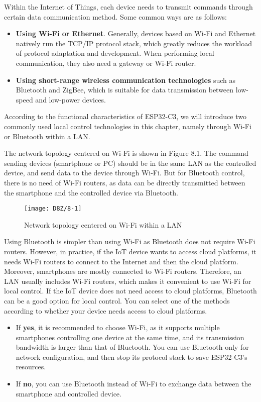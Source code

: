 \documentclass[a4paper,12pt]{book}
\begin{document}
Within the Internet of Things, each device needs to transmit commands through certain data communication method. Some common ways are as follows:

\begin{itemize}[leftmargin=1.5em]
    \item \textbf{Using Wi-Fi or Ethernet}. Generally, devices based on Wi-Fi and Ethernet natively run the TCP/IP protocol stack, which greatly reduces the workload of protocol adaptation and development. When performing local communication, they also need a gateway or Wi-Fi router.
    \item \textbf{Using short-range wireless communication technologies} such as Bluetooth and ZigBee, which is suitable for data transmission between low-speed and low-power devices.
\end{itemize}

According to the functional characteristics of ESP32-C3, we will introduce two commonly used local control technologies in this chapter, namely through Wi-Fi or Bluetooth within a LAN.

The network topology centered on Wi-Fi is shown in Figure 8.1. The command sending devices (smartphone or PC) should be in the same LAN as the controlled device, and send data to the device through Wi-Fi. But for Bluetooth control, there is no need of Wi-Fi routers, as data can be directly transmitted between the smartphone and the controlled device via Bluetooth.

\begin{figure}[!h]
    \centering
    \texttt{[image: D8Z/8-1]}
    \caption{Network topology centered on Wi-Fi within a LAN}
\end{figure}

Using Bluetooth is simpler than using Wi-Fi as Bluetooth does not require Wi-Fi routers. However, in practice, if the IoT device wants to access cloud platforms, it needs Wi-Fi routers to connect to the Internet and then the cloud platform. Moreover, smartphones are mostly connected to Wi-Fi routers. Therefore, an LAN usually includes Wi-Fi routers, which makes it convenient to use Wi-Fi for local control. If the IoT device does not need access to cloud platforms, Bluetooth can be a good option for local control. You can select one of the methods according to whether your device needs access to cloud platforms.

\begin{itemize}[leftmargin=1.5em]
    \item If \textbf{yes}, it is recommended to choose Wi-Fi, as it supports multiple smartphones controlling one device at the same time, and its transmission bandwidth is larger than that of Bluetooth. You can use Bluetooth only for network configuration, and then stop its protocol stack to save ESP32-C3’s resources.
    \item If \textbf{no}, you can use Bluetooth instead of Wi-Fi to exchange data between the smartphone and controlled device.
\end{itemize}
\end{document}
